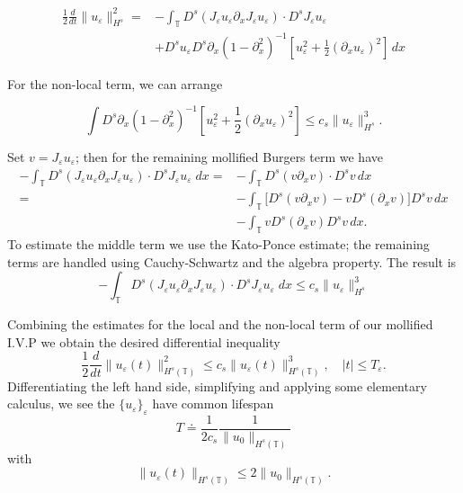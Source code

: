 \documentclass{beamer}
\newcommand{\p}{\partial}
\newcommand{\ci}{\mathbb{T}}
\newcommand{\ee}{\varepsilon}
\begin{document}
\begin{frame}
	
%
\begin{equation*} 
	\begin{split}
\frac 12
\frac{d}{dt} \|u_\ee \|_{H^s}^2
=
&-
\int_{\ci} D^s(J_\ee u_\ee \partial_x J_\ee u_\ee) \cdot  
D^s J_\ee u_\ee 
\\
&+ D^s u_\ee D^s\p_x(1-\p_x^2)^{-1} \left [u_\ee^2 + \frac12 (\p_x
	 u_\ee)^2 \right] 
	 \, dx
 \end{split}
\end{equation*}
%

For the non-local term, we can arrange


\begin{equation*}
	\int D^s\p_x(1-\p_x^2)^{-1} \left [u_\ee^2 + \frac12 (\p_x
	u_\ee)^2 \right] \le c_s \|u_\ee\|_{H^s}^3.
 \end{equation*}
 \end{frame}
 \begin{frame}
 Set $v=J_\ee u_\ee$; then for the remaining mollified Burgers term we have
\begin{equation*} 
	\begin{split}
\label{B-moli-int-v}
- \int_{\ci} D^s (J_{\ee} u_{\ee} \p_x J_\ee u_\ee) \cdot D^s
J_{\ee}u_\ee \; dx
= &-\int_\ci
     D^s(v \partial_x v) \cdot   D^s v \, dx
\\
=& -\int_\ci
\big[ 
D^s(v\p_x v)  -  v D^s (\p_xv)
\big]
 D^s v   \, dx
 \\
&
       -\int_\ci
  v D^s (\p_xv)
 D^sv\, dx.
 \end{split}
\end{equation*}
%
%
%
To estimate the middle term we use the Kato-Ponce estimate; the remaining terms
are handled using Cauchy-Schwartz and the algebra property. The result is
\begin{equation*} 
- \int_{\ci} D^s (J_{\ee} u_{\ee} \p_x J_\ee u_\ee) \cdot D^s
J_{\ee}u_\ee \; dx \le c_s \|u_\ee\|_{H^s}^3
 \end{equation*}
 \end{frame}
 \begin{frame}
 Combining the estimates for the local and the non-local term of our mollified
 I.V.P we obtain the desired differential inequality
\begin{equation*} 
\frac 12
\frac{d}{dt}
  \|u_\ee(t)\|_{H^{s}(\ci)}^2
\le
c_s
 \|u_\ee(t)\|_{H^{s}(\ci)}^3,
 \quad
|t| \le T_\ee.
\end{equation*}
Differentiating the left hand side, simplifying and applying some
elementary calculus, we see the $\{u_\ee\}_\ee$ have common lifespan
\begin{equation}
	T \doteq \frac{1}{2 c_s} \frac{1}{\|u_0\|_{H^s(\ci)}}
\end{equation}
with 
\begin{equation}
	\|u_\ee (t)\|_{H^s(\ci)} \le 2 \|u_0\|_{H^s(\ci)}.
\end{equation}

 \end{frame}
\end{document}
